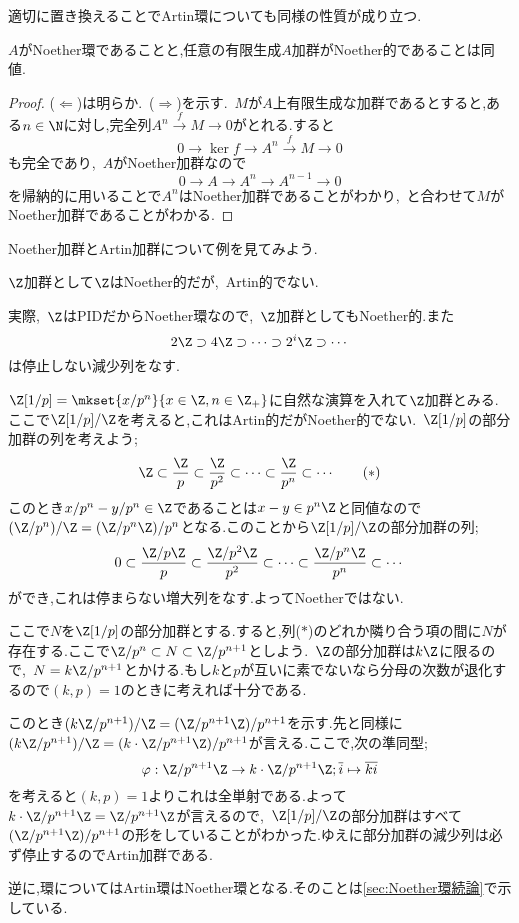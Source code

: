 適切に置き換えることでArtin環についても同様の性質が成り立つ.
\begin{prop}
	$A$がNoether環であることと,任意の有限生成$A$加群がNoether的であることは同値.
\end{prop}
\begin{proof}
	($\Longleftarrow$)は明らか.~($\Longrightarrow$)を示す.~$M$が$A$上有限生成な加群であるとすると,ある$n\in\N$に対し,完全列$A^n\overset{f}{\longrightarrow}M\longrightarrow0$がとれる.すると
	\begin{equation}\label{eq:有限生成A加群がNoether的}
		0\longrightarrow\ker f\longrightarrow A^n\overset{f}{\longrightarrow}M\longrightarrow 0
	\end{equation}
	も完全であり,~$A$がNoether加群なので
	\[0\longrightarrow A\longrightarrow A^n\longrightarrow A^{n-1}\longrightarrow0\]
	を帰納的に用いることで$A^n$はNoether加群であることがわかり,~と合わせて$M$がNoether加群であることがわかる.
\end{proof}

Noether加群とArtin加群について例を見てみよう.

\begin{ex}
	$\Z$加群として$\Z$はNoether的だが,~Artin的でない.
	
	実際,~$\Z$はPIDだからNoether環なので,~$\Z$加群としてもNoether的.また
	\[2\Z\supset4\Z\supset\dots\supset2^i\Z\supset\cdots\]
	は停止しない減少列をなす.
\end{ex}	
\begin{ex}
	$\Z[1/p]=\mkset{x/p^n}{x\in\Z,n\in\Z_+}$に自然な演算を入れて$\Z$加群とみる.ここで$\Z[1/p]/\Z$を考えると,これはArtin的だがNoether的でない.~$\Z[1/p]$の部分加群の列を考えよう;
	\[\Z\subset\frac{\Z}{p}\subset\frac{\Z}{p^2}\subset\dots\subset\frac{\Z}{p^n}\subset\cdots\tag{$\ast$}\]
	このとき$x/p^n-y/p^n\in\Z$であることは$x-y\in p^n\Z$と同値なので$(\Z/p^n)/\Z=(\Z/p^n\Z)/p^n$となる.このことから$\Z[1/p]/\Z$の部分加群の列;
	\[0\subset\frac{\Z/p\Z}{p}\subset\frac{\Z/p^2\Z}{p^2}\subset\dots\subset\frac{\Z/p^n\Z}{p^n}\subset\cdots\]
	ができ,これは停まらない増大列をなす.よってNoetherではない.
	
	ここで$N$を$\Z[1/p]$の部分加群とする.すると,列($\ast$)のどれか隣り合う項の間に$N$が存在する.ここで$\Z/p^n\subset N\subset\Z/p^{n+1}$としよう.~$\Z$の部分加群は$k\Z$に限るので,~$N=k\Z/p^{n+1}$とかける.もし$k$と$p$が互いに素でないなら分母の次数が退化するので$(k,p)=1$のときに考えれば十分である.
	
	このとき$(k\Z/p^{n+1})/\Z=(\Z/p^{n+1}\Z)/p^{n+1}$を示す.先と同様に$(k\Z/p^{n+1})/\Z=(k\cdot\Z/p^{n+1}\Z)/p^{n+1}$が言える.ここで,次の準同型;
	\[\varphi:\Z/p^{n+1}\Z\to k\cdot\Z/p^{n+1}\Z;\bar{i}\mapsto\bar{ki}\]
	を考えると$(k,p)=1$よりこれは全単射である.よって$k\cdot\Z/p^{n+1}\Z=\Z/p^{n+1}\Z$が言えるので,~$\Z[1/p]/\Z$の部分加群はすべて$(\Z/p^{n+1}\Z)/p^{n+1}$の形をしていることがわかった.ゆえに部分加群の減少列は必ず停止するのでArtin加群である.
\end{ex}	
逆に,環についてはArtin環はNoether環となる.そのことは\ref{sec:Noether環続論}で示している.


